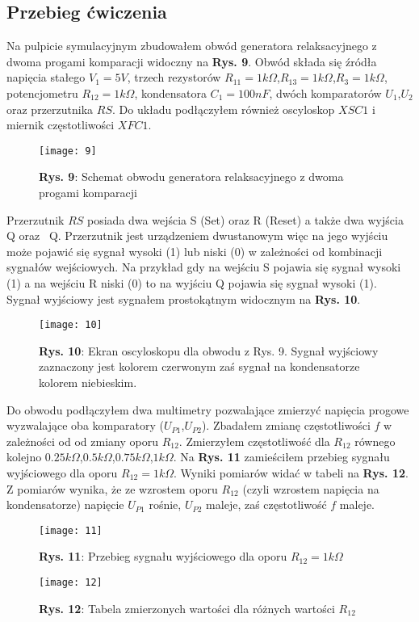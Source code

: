 \documentclass[12pt]{article}
\begin{document}
\subsection{Przebieg ćwiczenia}
Na pulpicie symulacyjnym zbudowałem obwód generatora relaksacyjnego z dwoma progami komparacji widoczny na \textbf{Rys. 9}. Obwód składa się źródła napięcia stałego $V_1=5V$, trzech rezystorów $R_{11}=1k\Omega$,$R_{13}=1k\Omega$,$R_3=1k\Omega$, potencjometru
$R_{12}=1k\Omega$, kondensatora $C_1=100nF$, dwóch komparatorów $U_1$,$U_2$ oraz przerzutnika $RS$. Do układu podłączyłem również oscyloskop $XSC1$ i miernik częstotliwości $XFC1$.
\begin{figure}[H]
\centering
\texttt{[image: 9]}
\caption*{\textbf{Rys. 9}: Schemat obwodu generatora relaksacyjnego z dwoma progami komparacji }
\end{figure}
\noindent Przerzutnik $RS$ posiada dwa wejścia S (Set) oraz R (Reset) a także dwa wyjścia Q oraz ~Q. Przerzutnik jest urządzeniem dwustanowym więc na jego wyjściu może pojawić się sygnał wysoki (1) lub niski (0) w zależności od kombinacji sygnałów wejściowych. Na przykład gdy na wejściu S pojawia się sygnał wysoki (1) a na wejściu R niski (0) to na wyjściu Q pojawia się sygnał wysoki (1). Sygnał wyjściowy jest sygnałem prostokątnym widocznym na \textbf{Rys. 10}.
\begin{figure}[H]
\centering
\texttt{[image: 10]}
\caption*{\textbf{Rys. 10}: Ekran oscyloskopu dla obwodu z Rys. 9. Sygnał wyjściowy zaznaczony jest kolorem czerwonym zaś sygnał na kondensatorze kolorem niebieskim. }
\end{figure}
\noindent Do obwodu podłączyłem dwa multimetry pozwalające zmierzyć napięcia progowe wyzwalające oba komparatory ($U_{P1}$,$U_{P2}$). Zbadałem zmianę częstotliwości $f$ w zależności od od zmiany oporu $R_{12}$. Zmierzyłem częstotliwość dla $R_{12}$ równego kolejno
$0.25k\Omega$,$0.5k\Omega$,$0.75k\Omega$,$1k\Omega$. Na \textbf{Rys. 11} zamieściłem przebieg sygnału wyjściowego dla oporu $R_{12}=1k\Omega$. Wyniki pomiarów widać w tabeli na \textbf{Rys. 12}. Z pomiarów wynika, że ze wzrostem oporu $R_{12}$ (czyli wzrostem napięcia na kondensatorze) napięcie $U_{P1}$ rośnie, $U_{P2}$ maleje, zaś częstotliwość $f$ maleje.
\begin{figure}[H]
\centering
\texttt{[image: 11]}
\caption*{\textbf{Rys. 11}: Przebieg sygnału wyjściowego dla oporu $R_{12}=1k\Omega$ }
\end{figure}
\begin{figure}[H]
\centering
\texttt{[image: 12]}
\caption*{\textbf{Rys. 12}: Tabela zmierzonych wartości dla różnych wartości $R_{12}$ }
\end{figure}
\end{document}
